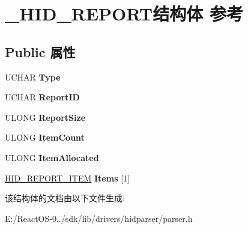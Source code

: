 \hypertarget{struct___h_i_d___r_e_p_o_r_t}{}\section{\+\_\+\+H\+I\+D\+\_\+\+R\+E\+P\+O\+R\+T结构体 参考}
\label{struct___h_i_d___r_e_p_o_r_t}
\subsection*{Public 属性}
\begin{DoxyCompactItemize}
\item 
\mbox{\label{struct___h_i_d___r_e_p_o_r_t_a3f9e54a091c2fd68e1dc7ae61bb17f7f}} 
U\+C\+H\+AR {\bfseries Type}
\item 
\mbox{\label{struct___h_i_d___r_e_p_o_r_t_a3a30bdf7a7f3bff5a803f4bc0b9f643f}} 
U\+C\+H\+AR {\bfseries Report\+ID}
\item 
\mbox{\label{struct___h_i_d___r_e_p_o_r_t_a69359ba35d5aded47192b6d5603f602e}} 
U\+L\+O\+NG {\bfseries Report\+Size}
\item 
\mbox{\label{struct___h_i_d___r_e_p_o_r_t_aa41e5d8bf2ff3fd71c2ff564c7329738}} 
U\+L\+O\+NG {\bfseries Item\+Count}
\item 
\mbox{\label{struct___h_i_d___r_e_p_o_r_t_a7df3e504a09d24cd2abe9e35c7c78792}} 
U\+L\+O\+NG {\bfseries Item\+Allocated}
\item 
\mbox{\label{struct___h_i_d___r_e_p_o_r_t_a786ed748d2eea40aed2db59ea91f8d81}} 
\hyperlink{struct_h_i_d___r_e_p_o_r_t___i_t_e_m}{H\+I\+D\+\_\+\+R\+E\+P\+O\+R\+T\+\_\+\+I\+T\+EM} {\bfseries Items} \mbox{[}1\mbox{]}
\end{DoxyCompactItemize}


该结构体的文档由以下文件生成\+:\begin{DoxyCompactItemize}
\item 
E\+:/\+React\+O\+S-\/0../sdk/lib/drivers/hidparser/parser.\+h\end{DoxyCompactItemize}
